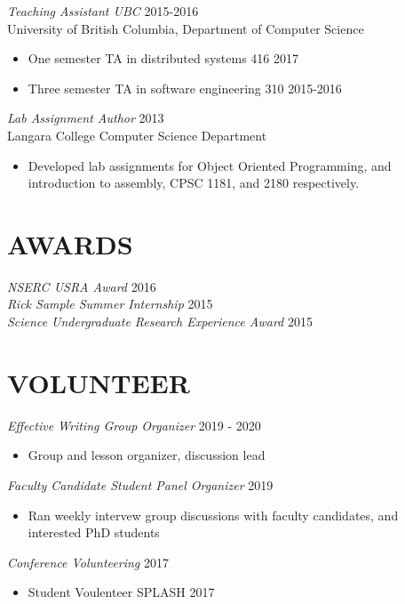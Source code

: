 \documentclass[line,margin]{res}
\begin{document}
\begin{resume}
{{\sl Teaching Assistant UBC} \hfill 2015-2016\\
	University of British Columbia, Department of Computer Science
\begin{itemize} \itemsep -2pt
        \item One semester TA in distributed systems 416 \hfill 2017
		\item Three semester TA in software engineering 310 \hfill 2015-2016\\
	\end{itemize}
{\sl Lab Assignment Author} \hfill 2013\\
	Langara College Computer Science Department
	\begin{itemize} \itemsep -2pt
			\item Developed lab assignments for Object Oriented Programming, and introduction to assembly, CPSC 1181, and 2180 respectively.
	\end{itemize}
    

\section{AWARDS}
{\sl NSERC USRA Award} \hfill 2016\\
{\sl Rick Sample Summer Internship} \hfill 2015\\
{\sl Science Undergraduate Research Experience Award} \hfill 2015\\


\section{VOLUNTEER}

{\sl Effective Writing Group Organizer} {\hfill 2019 - 2020}
    \begin{itemize}
        \item Group and lesson organizer, discussion lead
    \end{itemize}

{\sl Faculty Candidate Student Panel Organizer} {\hfill 2019}
    \begin{itemize}
        \item Ran weekly intervew group discussions with faculty
            candidates, and interested PhD students
     \end{itemize}

{\sl Conference Volunteering} \hfill 2017
    \begin{itemize}
        \item Student Voulenteer SPLASH 2017
    \end{itemize}

}
\end{resume}
\end{document}
